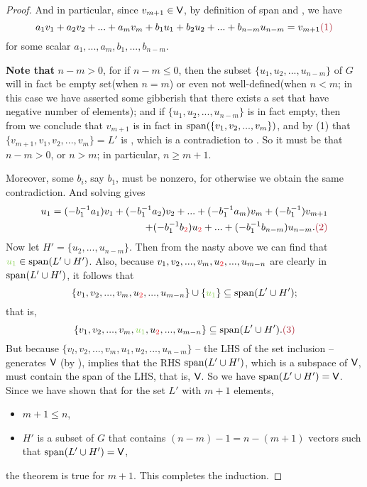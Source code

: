 \begin{proof}
And in particular, since \(v_{m + 1} \in \textsf{V}\), by definition of span and , we have
\[
    a_1 v_1 + a_2 v_2 + ... + a_m v_m + b_1 u_1 + b_2 u_2 + ... + b_{n - m} u_{n - m} = v_{m + 1} \MAROON{(1)}
\]
for some scalar \(a_1, ..., a_m, b_1, ..., b_{n - m}\).

\textbf{Note that} \(n - m > 0\), for if \(n - m \le 0\), then the subset \(\{ u_1, u_2, ..., u_{n - m} \}\) of \(G\) will in fact be empty set(when \(n = m\)) or even not well-defined(when \(n < m\); in this case we have asserted some gibberish that there exists a set that have negative number of elements);
and if \(\{ u_1, u_2, ..., u_{n - m} \}\) is in fact empty, then from  we conclude that \(v_{m + 1}\) is in fact in \(\operatorname{span}(\{ v_1, v_2, ..., v_m \})\), and by (1) that \(\{ v_{m + 1}, v_1, v_2, ..., v_m \} = L'\) is \LDP{}, which is a contradiction to \BLUE{(*)}.
So it must be that \(n - m > 0\), or \(n > m\);
in particular, \(n \ge m + 1\).

Moreover, some \(b_i\), say \(b_1\), must be nonzero, for otherwise we obtain the same contradiction.
And solving  gives
\begin{align*}
    u_1 = (-b_1^{-1} a_1) v_1 + (-b_1^{-1} a_2) v_2 + ... + (-b_1^{-1} a_m) v_m + (-b_1^{-1}) v_{m + 1} \\
        + (-b_1^{-1} b_{\RED{2}}) u_{\RED{2}} + ... + (-b^{-1}_1 b_{n - m}) u_{n - m}. \MAROON{(2)}
\end{align*}
Now let \(H' = \{ u_2, ..., u_{n - m} \}\).
Then from the nasty  above we can find that \(\GREEN{u_1} \in \spann(L' \cup H')\).
Also, because \(v_1, v_2, ..., v_m, u_{\RED{2}}, ..., u_{m - n}\) are clearly in \(\operatorname{span}(L' \cup H')\), it follows that
\[
    \{ v_1, v_2, ..., v_m, u_{\RED{2}}, ..., u_{m - n}\} \cup \{ \GREEN{u_1} \} \subseteq \spann(L' \cup H');
\]
that is,
\[
    \{ v_1, v_2, ..., v_m, \GREEN{u_1}, u_{\RED{2}}, ..., u_{m - n}\} \subseteq \spann(L' \cup H'). \MAROON{(3)}
\]
But because \(\{ v_l, v_2, ..., v_m, u_1, u_2, ..., u_{n - m} \}\) -- the LHS of the set inclusion  -- generates \(\textsf{V}\) (by ),
 implies that the RHS \(\operatorname{span}(L' \cup H')\), which is a subspace of \(\textsf{V}\), must contain the span of the LHS, that is, \(\textsf{V}\).
So we have \(\operatorname{span}(L' \cup H') = \textsf{V}\).
Since we have shown that for the \LID{} set \(L'\) with \(m + 1\) elements,
\begin{itemize}
    \item \(m + 1 \le n\),
    \item \(H'\) is a subset of \(G\) that contains \((n - m) - 1 = n - (m + 1)\) vectors such that \(\operatorname{span}(L' \cup H') = \textsf{V}\),
\end{itemize}
the theorem is true for \(m + 1\).
This completes the induction.
\end{proof}

